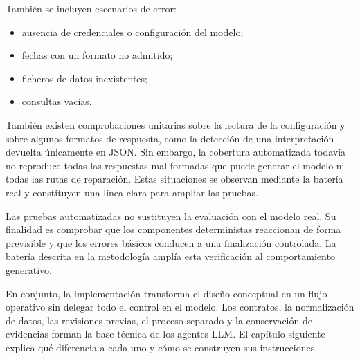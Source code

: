 También se incluyen escenarios de error:

\begin{itemize}
    \item ausencia de credenciales o configuración del modelo;
    \item fechas con un formato no admitido;
    \item ficheros de datos inexistentes;
    \item consultas vacías.
\end{itemize}

También existen comprobaciones unitarias sobre la lectura de la configuración y sobre algunos formatos de respuesta, como la detección de una interpretación devuelta únicamente en JSON. Sin embargo, la cobertura automatizada todavía no reproduce todas las respuestas mal formadas que puede generar el modelo ni todas las rutas de reparación. Estas situaciones se observan mediante la batería real y constituyen una línea clara para ampliar las pruebas.

Las pruebas automatizadas no sustituyen la evaluación con el modelo real. Su finalidad es comprobar que los componentes deterministas reaccionan de forma previsible y que los errores básicos conducen a una finalización controlada. La batería descrita en la metodología amplía esta verificación al comportamiento generativo.

En conjunto, la implementación transforma el diseño conceptual en un flujo operativo sin delegar todo el control en el modelo. Los contratos, la normalización de datos, las revisiones previas, el proceso separado y la conservación de evidencias forman la base técnica de los agentes LLM. El capítulo siguiente explica qué diferencia a cada uno y cómo se construyen sus instrucciones.
